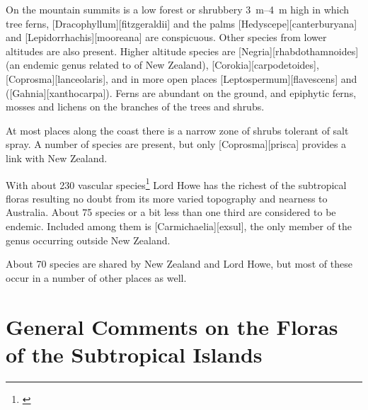 On the mountain summits is a low forest or shrubbery \SIrange{3}{4}{\metre} high in which tree ferns, [Dracophyllum][fitzgeraldii] and the palms [Hedyscepe][canterburyana] and [Lepidorrhachis][mooreana] are conspicuous.
Other species from lower altitudes are also present.
Higher altitude species are [Negria][rhabdothamnoides] (an endemic genus related to  of New Zealand), [Corokia][carpodetoides], [Coprosma][lanceolaris], and in more open places [Leptospermum][flavescens] and  ([Gahnia][xanthocarpa]).
Ferns are abundant on the ground, and epiphytic ferns, mosses and lichens on the branches of the trees and shrubs.

At most places along the coast there is a narrow zone of shrubs tolerant of salt spray.
A number of species are present, but only [Coprosma][prisca] provides a link with New Zealand.

With about 230 vascular species\footnote{\cite{rodd1983census}} Lord Howe has the richest of the subtropical floras resulting no doubt from its more varied topography and nearness to Australia.
About 75 species or a bit less than one third are considered to be endemic.
Included among them is [Carmichaelia][exsul], the only member of the genus occurring outside New Zealand.

About 70 species are shared by New Zealand and Lord Howe, but most of these occur in a number of other places as well.

\section{General Comments on the Floras of the Subtropical Islands}

